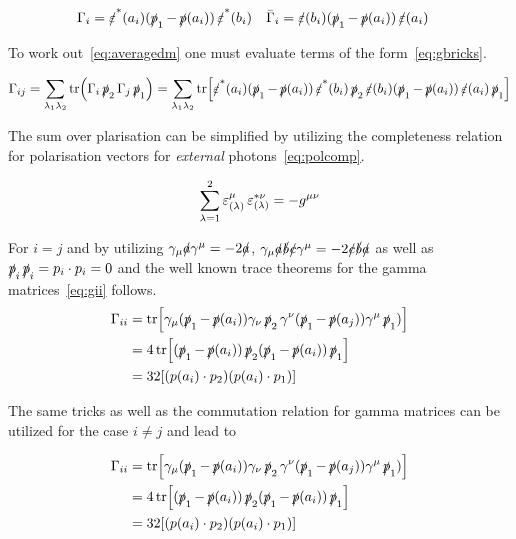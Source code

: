 \begin{align}
  \label{eq:shortgamma}
  \Gamma_i &= \pses(a_i)(\ps_1 - \ps(a_i))\pses(b_i) & \bar{\Gamma}_i &= \pes(b_i)(\ps_1 - \ps(a_i))\pes(a_i)
\end{align}

To work out~\eqref{eq:averagedm} one must evaluate terms of the
form~\eqref{eq:gbricks}.

\begin{align}
  \label{eq:gbricks}
  \Gamma_{ij} = \sum_{\lambda_1\lambda_2} \tr(\Gamma_i\ps_2\Gamma_j\ps_1) =
  \sum_{\lambda_1\lambda_2} \tr[\pses(a_i)(\ps_1-\ps(a_i))\pses(b_i)\ps_2\pes(b_i)(\ps_1 - \ps(a_i))\pes(a_i)\ps_1]
\end{align}

The sum over plarisation can be simplified by utilizing the
completeness relation for polarisation vectors for \emph{external}
photons~\eqref{eq:polcomp}.

\begin{equation}
  \label{eq:polcomp}
  \sum_{\lambda=1}^{2}\pe_{(\lambda)}^\mu\pe_{(\lambda)}^{*\nu} = -g^{\mu\nu}
\end{equation}

For \(i=j\) and by utilizing \(\gamma_\mu\sl{a}\gamma^\mu=-2\sl{a}\),
 \(\gamma_\mu\sl{a}\sl{b}\sl{c}\gamma^\mu=-2\sl{c}\sl{b}\sl{a}\) as
well as \(\ps_i\ps_i=p_i\cdot p_i = 0\) and the well known trace
theorems for the gamma matrices~\eqref{eq:gii} follows.
\begin{equation}
  \label{eq:gii}
  \begin{split}
\Gamma_{ii} &=
\tr[\gamma_\mu(\ps_1-\ps(a_i))\gamma_\nu\ps_2\gamma^\nu(\ps_1-\ps(a_j))\gamma^\mu\ps_1)]
\\
&= 4\tr[(\ps_1-\ps(a_i))\ps_2(\ps_1-\ps(a_i))\ps_1]\\
&= 32\qty[(p(a_i)\cdot p_2)(p(a_i)\cdot p_1)]
\end{split}
\end{equation}

The same tricks as well as the commutation relation for gamma matrices
can be utilized for the case \(i\neq j\) and lead to

\begin{equation}
  \label{eq:gii}
  \begin{split}
\Gamma_{ii} &=
\tr[\gamma_\mu(\ps_1-\ps(a_i))\gamma_\nu\ps_2\gamma^\nu(\ps_1-\ps(a_j))\gamma^\mu\ps_1)]
\\
&= 4\tr[(\ps_1-\ps(a_i))\ps_2(\ps_1-\ps(a_i))\ps_1]\\
&= 32\qty[(p(a_i)\cdot p_2)(p(a_i)\cdot p_1)]
\end{split}
\end{equation}
